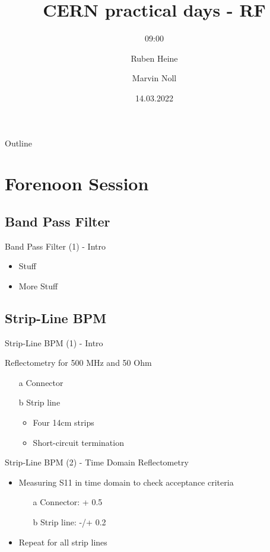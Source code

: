 \documentclass{beamer}
\title[Practical Days - RF]{CERN practical days - RF}
\subtitle{09:00}
\author[Heine, Noll]{Ruben Heine \and Marvin Noll}
\date[\today]{14.03.2022}
\begin{document}
\begin{frame}[plain]
  \titlepage
\end{frame}

\begin{frame}{Outline}
    \tableofcontents
\end{frame}

\section{Forenoon Session}
\subsection{Band Pass Filter}
\begin{frame}[t,fragile]{Band Pass Filter (1) - Intro}
\begin{itemize}
\item Stuff
\item More Stuff
\end{itemize}
\end{frame}

\subsection{Strip-Line BPM}
\begin{frame}[t,fragile]{Strip-Line BPM (1) - Intro}

Reflectometry for 500 MHz and 50 Ohm
\begin{itemize}
\item[a] Connector
\item[b] Strip line
\begin{itemize}
\item Four 14cm strips
\item Short-circuit termination
\end{itemize}
\end{itemize}
\end{frame}

\begin{frame}[t,fragile]{Strip-Line BPM (2) - Time Domain Reflectometry}
\begin{itemize}
\item Measuring S11 in time domain to check acceptance criteria
\begin{itemize}
\item[a] Connector: + 0.5
\item[b] Strip line: -/+ 0.2
\end{itemize}
\item Repeat for all strip lines
\end{itemize}

\end{frame}
\end{document}

